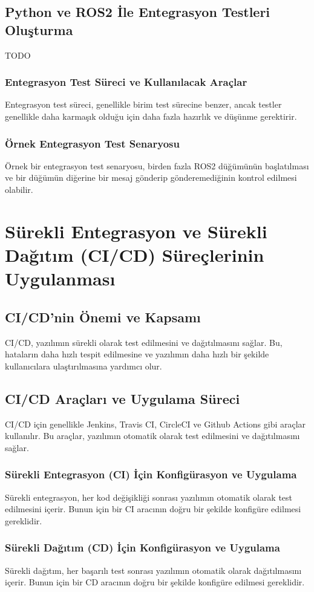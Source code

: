 \subsection{Python ve ROS2 İle Entegrasyon Testleri Oluşturma}
TODO

\subsubsection{Entegrasyon Test Süreci ve Kullanılacak Araçlar}
Entegrasyon test süreci, genellikle birim test sürecine benzer, ancak testler genellikle daha karmaşık olduğu için daha fazla hazırlık ve düşünme gerektirir.

\subsubsection{Örnek Entegrasyon Test Senaryosu}
Örnek bir entegrasyon test senaryosu, birden fazla ROS2 düğümünün başlatılması ve bir düğümün diğerine bir mesaj gönderip gönderemediğinin kontrol edilmesi olabilir.

\section{Sürekli Entegrasyon ve Sürekli Dağıtım (CI/CD) Süreçlerinin Uygulanması}
\subsection{CI/CD'nin Önemi ve Kapsamı}
CI/CD, yazılımın sürekli olarak test edilmesini ve dağıtılmasını sağlar. Bu, hataların daha hızlı tespit edilmesine ve yazılımın daha hızlı bir şekilde kullanıcılara ulaştırılmasına yardımcı olur.

\subsection{CI/CD Araçları ve Uygulama Süreci}
CI/CD için genellikle Jenkins, Travis CI, CircleCI ve Github Actions gibi araçlar kullanılır. Bu araçlar, yazılımın otomatik olarak test edilmesini ve dağıtılmasını sağlar.

\subsubsection{Sürekli Entegrasyon (CI) İçin Konfigürasyon ve Uygulama}
Sürekli entegrasyon, her kod değişikliği sonrası yazılımın otomatik olarak test edilmesini içerir. Bunun için bir CI aracının doğru bir şekilde konfigüre edilmesi gereklidir.

\subsubsection{Sürekli Dağıtım (CD) İçin Konfigürasyon ve Uygulama}
Sürekli dağıtım, her başarılı test sonrası yazılımın otomatik olarak dağıtılmasını içerir. Bunun için bir CD aracının doğru bir şekilde konfigüre edilmesi gereklidir.
